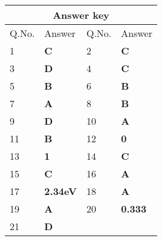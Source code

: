 \begin{table}[H]
	\centering
	\begin{tabular}{|p{1.5cm}|p{1.5cm}||p{1.5cm}|p{1.5cm}|}
		\hline
		\multicolumn{4}{|c|}{\textbf{Answer key}}\\\hline\hline
		\rowcolor{ocrel}Q.No.&Answer&Q.No.&Answer\\\hline
		1&\textbf{C} &2&\textbf{C}\\\hline 
		3&\textbf{D} &4&\textbf{C} \\\hline
		5&\textbf{B} &6&\textbf{B} \\\hline
		7&\textbf{A}&8&\textbf{B}\\\hline
		9&\textbf{D}&10&\textbf{A}\\\hline
		11&\textbf{B} &12&\textbf{0}\\\hline
		13&\textbf{1}&14&\textbf{C}\\\hline
		15&\textbf{C}&16&\textbf{A} \\\hline
		17&\textbf{2.34eV}&18&\textbf{A}\\\hline
		19&\textbf{A}&20&\textbf{0.333}\\\hline
		21&\textbf{D}&&\textbf{}\\\hline
	\end{tabular}
\end{table}

